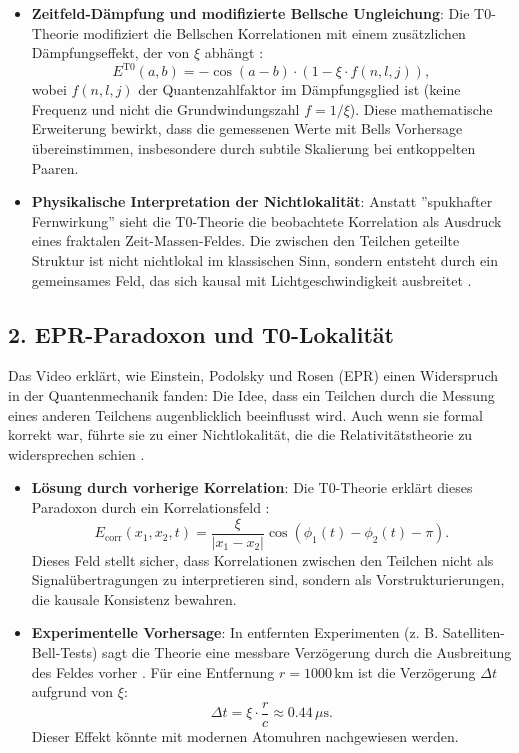 	\begin{itemize}
		\item \textbf{Zeitfeld-Dämpfung und modifizierte Bellsche Ungleichung}: Die T0-Theorie modifiziert die Bellschen Korrelationen mit einem zusätzlichen Dämpfungseffekt, der von $\xi$ abhängt \cite{Bell_En}:
		\[
		E^{\mathrm{T0}}(a,b) = -\cos(a-b) \cdot (1 - \xi \cdot f(n,l,j)),
		\]
		wobei $f(n,l,j)$ der Quantenzahlfaktor im Dämpfungsglied ist (keine Frequenz und nicht die Grundwindungszahl $f = 1/\xi$). Diese mathematische Erweiterung bewirkt, dass die gemessenen Werte mit Bells Vorhersage übereinstimmen, insbesondere durch subtile Skalierung bei entkoppelten Paaren.
		
		\item \textbf{Physikalische Interpretation der Nichtlokalität}: Anstatt ''spukhafter Fernwirkung'' sieht die T0-Theorie die beobachtete Korrelation als Ausdruck eines fraktalen Zeit-Massen-Feldes. Die zwischen den Teilchen geteilte Struktur ist nicht nichtlokal im klassischen Sinn, sondern entsteht durch ein gemeinsames Feld, das sich kausal mit Lichtgeschwindigkeit ausbreitet \cite{131_scheinbar_instantan_En}.
	\end{itemize}

	\subsection*{2. EPR-Paradoxon und T0-Lokalität}
	
	Das Video erklärt, wie Einstein, Podolsky und Rosen (EPR) einen Widerspruch in der Quantenmechanik fanden: Die Idee, dass ein Teilchen durch die Messung eines anderen Teilchens augenblicklich beeinflusst wird. Auch wenn sie formal korrekt war, führte sie zu einer Nichtlokalität, die die Relativitätstheorie zu widersprechen schien \cite{VideoBell2024}.
	
	\begin{itemize}
		\item \textbf{Lösung durch vorherige Korrelation}: Die T0-Theorie erklärt dieses Paradoxon durch ein Korrelationsfeld :
		\[
		E_{\mathrm{corr}}(x_1, x_2, t) = \frac{\xi}{|x_1 - x_2|} \cos\left(\phi_1(t) - \phi_2(t) - \pi\right).
		\]
		Dieses Feld stellt sicher, dass Korrelationen zwischen den Teilchen nicht als Signalübertragungen zu interpretieren sind, sondern als Vorstrukturierungen, die kausale Konsistenz bewahren.
		
		\item \textbf{Experimentelle Vorhersage}: In entfernten Experimenten (z. B. Satelliten-Bell-Tests) sagt die Theorie eine messbare Verzögerung durch die Ausbreitung des Feldes vorher \cite{131_scheinbar_instantan_En}. Für eine Entfernung $r = 1000 \, \text{km}$ ist die Verzögerung $\Delta t$ aufgrund von $\xi$:
		\[
		\Delta t = \xi \cdot \frac{r}{c} \approx 0.44 \, \mu\text{s}.
		\]
		Dieser Effekt könnte mit modernen Atomuhren nachgewiesen werden.
	\end{itemize}
	
